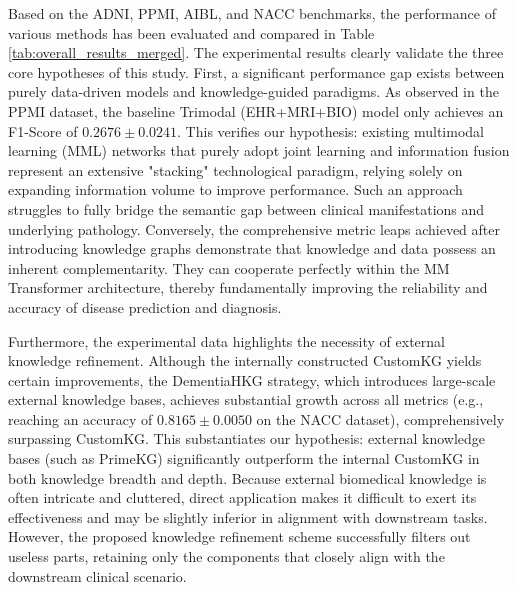 \documentclass[lettersize,journal]{IEEEtran}
\begin{document}
Based on the ADNI, PPMI, AIBL, and NACC benchmarks, the performance of various methods has been evaluated and compared in Table \ref{tab:overall_results_merged}. The experimental results clearly validate the three core hypotheses of this study. First, a significant performance gap exists between purely data-driven models and knowledge-guided paradigms. As observed in the PPMI dataset, the baseline Trimodal (EHR+MRI+BIO) model only achieves an F1-Score of $0.2676 \pm 0.0241$. This verifies our hypothesis: existing multimodal learning (MML) networks that purely adopt joint learning and information fusion represent an extensive "stacking" technological paradigm, relying solely on expanding information volume to improve performance. Such an approach struggles to fully bridge the semantic gap between clinical manifestations and underlying pathology. Conversely, the comprehensive metric leaps achieved after introducing knowledge graphs demonstrate that knowledge and data possess an inherent complementarity. They can cooperate perfectly within the MM Transformer architecture, thereby fundamentally improving the reliability and accuracy of disease prediction and diagnosis.

Furthermore, the experimental data highlights the necessity of external knowledge refinement. Although the internally constructed CustomKG yields certain improvements, the DementiaHKG strategy, which introduces large-scale external knowledge bases, achieves substantial growth across all metrics (e.g., reaching an accuracy of $0.8165 \pm 0.0050$ on the NACC dataset), comprehensively surpassing CustomKG. This substantiates our hypothesis: external knowledge bases (such as PrimeKG) significantly outperform the internal CustomKG in both knowledge breadth and depth. Because external biomedical knowledge is often intricate and cluttered, direct application makes it difficult to exert its effectiveness and may be slightly inferior in alignment with downstream tasks. However, the proposed knowledge refinement scheme successfully filters out useless parts, retaining only the components that closely align with the downstream clinical scenario.
\end{document}
